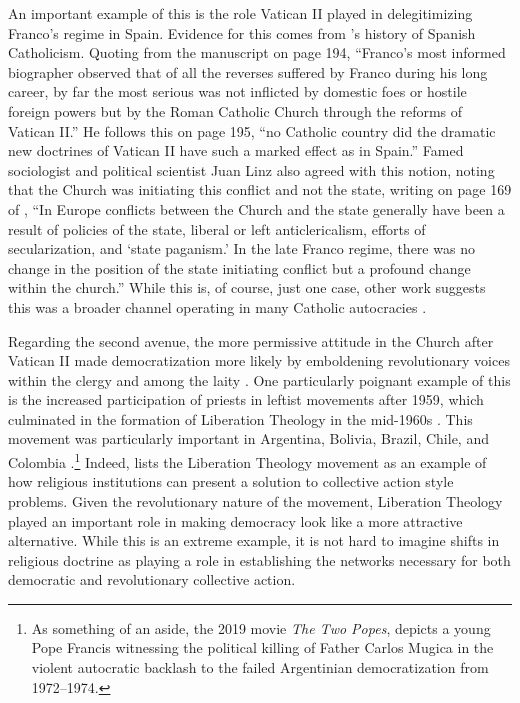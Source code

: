 An important example of this is the role Vatican II played in delegitimizing Franco's regime in Spain. Evidence for this comes from \cite{Payne1984}'s history of Spanish Catholicism. Quoting from the manuscript on page 194, ``Franco's most informed biographer observed that of all the reverses suffered by Franco during his long career, by far the most serious was not inflicted by domestic foes or hostile foreign powers but by the Roman Catholic Church through the reforms of Vatican II.'' He follows this on page 195, ``no Catholic country did the dramatic new doctrines of Vatican II have such a marked effect as in Spain.'' Famed sociologist and political scientist Juan Linz also agreed with this notion, noting that the Church was initiating this conflict and not the state, writing on page 169 of \cite{Linz1991}, ``In Europe conflicts between the Church and the state generally have been a result of policies of the state, liberal or left anticlericalism, efforts of secularization, and `state paganism.' In the late Franco regime, there was no change in the position of the state initiating conflict but a profound change within the church.'' While this is, of course, just one case, other work suggests this was a broader channel operating in many Catholic autocracies \citep{Andersen2019}.
\label{par:legit_end}

\label{par:liberation_theology}
Regarding the second avenue, the more permissive attitude in the Church after Vatican II made democratization more likely by emboldening revolutionary voices within the clergy and among the laity \citep*{Guiso2003, Guiso2006}. One particularly poignant example of this is the increased participation of priests in leftist movements after 1959, which culminated in the formation of Liberation Theology in the mid-1960s \citep{Buschges2021}. This movement was particularly important in Argentina, Bolivia, Brazil, Chile, and Colombia \citep{Berryman1973}.\footnote{As something of an aside, the 2019 movie \textit{The Two Popes}, depicts a young Pope Francis witnessing the political killing of Father Carlos Mugica in the violent autocratic backlash to the failed Argentinian democratization from 1972--1974.} Indeed, \cite{Moore1995} lists the Liberation Theology movement as an example of how religious institutions can present a solution to collective action style problems. Given the revolutionary nature of the movement, Liberation Theology played an important role in making democracy look like a more attractive alternative. While this is an extreme example, it is not hard to imagine shifts in religious doctrine as playing a role in establishing the networks necessary for both democratic and revolutionary collective action.

